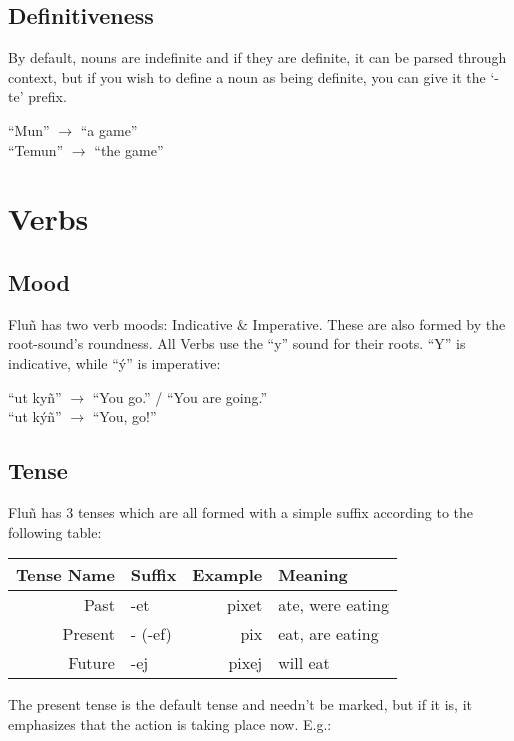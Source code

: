 \documentclass{book}
\begin{document}
\subsection{Definitiveness}
By default, nouns are indefinite and if they are definite, it can be parsed through context,
but if you wish to define a noun as being definite, you can give it the `-te' prefix.

\begin{center}
    ``Mun'' $\rightarrow$ ``a game'' \\
    ``Temun'' $\rightarrow$ ``the game''
\end{center}


\section{Verbs}
\subsection{Mood}
Fluñ has two verb moods: Indicative \& Imperative. These are also formed by the root-sound's roundness.
All Verbs use the ``y'' sound for their roots. ``Y'' is indicative, while ``ý'' is imperative:

\begin{center}
    ``ut kyñ'' $\rightarrow$ ``You go.'' / ``You are going.'' \\
    ``ut kýñ'' $\rightarrow$ ``You, go!''
\end{center}

\subsection{Tense}
Fluñ has 3 tenses which are all formed with a simple suffix according to the following table:

\begin{center}
    \begin{tabular}{|r|l|r|l|}
        \hline
        Tense Name  & Suffix    & Example   & Meaning \\
        \hline
        Past        & -et       & pixet     & ate, were eating \\
        Present     & - (-ef)   & pix       & eat, are eating \\
        Future      & -ej       & pixej     & will eat \\
        \hline
    \end{tabular}
\end{center}
The present tense is the default tense and needn't be marked, but if it is, it emphasizes that
the action is taking place now. E.g.:
\end{document}
